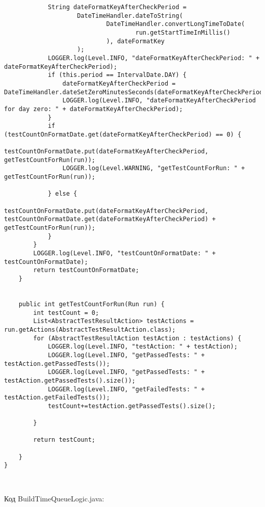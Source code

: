 \begin{lstlisting}
            String dateFormatKeyAfterCheckPeriod =
                    DateTimeHandler.dateToString(
                            DateTimeHandler.convertLongTimeToDate(
                                    run.getStartTimeInMillis()
                            ), dateFormatKey
                    );
            LOGGER.log(Level.INFO, "dateFormatKeyAfterCheckPeriod: " + dateFormatKeyAfterCheckPeriod);
            if (this.period == IntervalDate.DAY) {
                dateFormatKeyAfterCheckPeriod = DateTimeHandler.dateSetZeroMinutesSeconds(dateFormatKeyAfterCheckPeriod);
                LOGGER.log(Level.INFO, "dateFormatKeyAfterCheckPeriod for day zero: " + dateFormatKeyAfterCheckPeriod);
            }
            if (testCountOnFormatDate.get(dateFormatKeyAfterCheckPeriod) == 0) {
                testCountOnFormatDate.put(dateFormatKeyAfterCheckPeriod, getTestCountForRun(run));
                LOGGER.log(Level.WARNING, "getTestCountForRun: " + getTestCountForRun(run));

            } else {
                testCountOnFormatDate.put(dateFormatKeyAfterCheckPeriod, testCountOnFormatDate.get(dateFormatKeyAfterCheckPeriod) + getTestCountForRun(run));
            }
        }
        LOGGER.log(Level.INFO, "testCountOnFormatDate: " + testCountOnFormatDate);
        return testCountOnFormatDate;
    }


    public int getTestCountForRun(Run run) {
        int testCount = 0;
        List<AbstractTestResultAction> testActions = run.getActions(AbstractTestResultAction.class);
        for (AbstractTestResultAction testAction : testActions) {
            LOGGER.log(Level.INFO, "testAction: " + testAction);
            LOGGER.log(Level.INFO, "getPassedTests: " + testAction.getPassedTests());
            LOGGER.log(Level.INFO, "getPassedTests: " + testAction.getPassedTests().size());
            LOGGER.log(Level.INFO, "getFailedTests: " + testAction.getFailedTests());
            testCount+=testAction.getPassedTests().size();

        }

        return testCount;

    }
}



\end{lstlisting}

Код BuildTimeQueueLogic.java:

